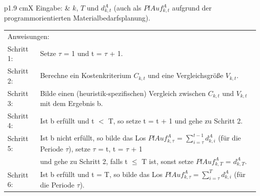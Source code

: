 \documentclass[13pt,a4paper, listof=entryprefix, bibliography=totocnumbered,toc=listofnumbered,lof=listofnumbered]{scrartcl}
\begin{document}
\begin{algorithmic}
	\label{algo:Heuristiken_einstufiges_Losgroessenproblem}
	\STATE
	\begin{tabularx}{\linewidth}{p{1.9 cm}X}
		Eingabe: & $k$, $T$ und $d^{A}_{k,t}$ (auch als $PlAuf^{A}_{k,t}$ aufgrund der programmorientierten Materialbedarfsplanung).
	\end{tabularx}
	\addtocounter{table}{-1} %

	\STATE
	\begin{tabularx}{\linewidth}{p{} X}
		\multicolumn{2}{l}{Anweisungen:}                                                                                                                                                         \\
		\rule{0cm}{0,8cm}Schritt 1: & Setze $\tau$ = 1 und t =  $\tau$ + 1.                                                                                                                      \\
		Schritt 2:                  & Berechne ein Kostenkriterium $C_{k,t} $ und eine Vergleichsgröße $V_{k,t}$.                                                                                \\
		Schritt 3:                  & Bilde einen (heuristik-spezifischen) Vergleich zwischen $C_{k,t}$ und $V_{k,t}$ mit dem Ergebnis b.                                                        \\
		Schritt 4:                  & Ist b erfüllt und t $<$ T, so setze t = t + 1 und gehe zu Schritt 2.                                                                                       \\
		Schritt 5:                  & Ist b nicht erfüllt, so bilde das Los $PlAuf^{A}_{k,\tau}$ = $ \sum_{i=\tau}^{t-1}d^{A}_{k,i} $ (für die Periode $\tau$), setze $\tau$ = t, t = $\tau$ + 1 \\
		                            & und gehe zu Schritt 2, falls t $\le$ T ist, sonst setze $PlAuf^{A}_{k,T}$ = $d^{A}_{k,T}$.                                                                 \\
		Schritt 6:                  & Ist b erfüllt und t = T, so bilde das Los $PlAuf^{A}_{k,\tau} = \sum_{i =\tau}^{T} d^{A}_{k,i}$ (für die Periode $\tau$).

\end{tabularx}
\end{algorithmic}
\end{document}
